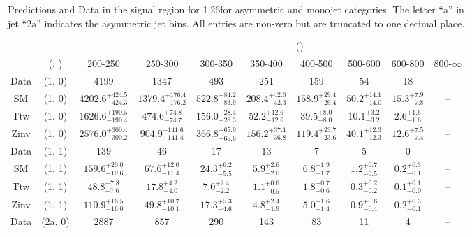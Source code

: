 \begin{table}[h!]
\tiny
\centering
\caption{Predictions and Data in the signal region for 1.26\ifb for asymmetric and monojet categories. The letter ``a'' in jet \eg ``2a''  indicates the asymmetric jet bins. All entries are non-zero but are truncated to one decimal place.\label{tab:predall_comb_sig_asym}}
\begin{tabular}
{cccccccccc}
	\hline\hline
&	&	& \multicolumn{8}{c}{\scalht (\gev)}\\ 
	&	 (\njet, \nb) & 200-250 & 250-300 & 300-350 & 350-400 & 400-500 & 500-600 & 600-800 & 800-$\infty$ \\ [0.8ex] 
\hline
	Data & (1. 0) & 4199 & 1347 & 493 & 251 & 159 & 54 & 18 & -- \\[0.5ex] 
	SM & (1. 0) & $4202.6^{+ 424.5 }_{- 424.3 }$ & $1379.4^{+ 176.4 }_{- 176.2 }$ & $522.8^{+ 84.2 }_{- 83.9 }$ & $208.4^{+ 42.6 }_{- 42.3 }$ & $158.9^{+ 29.4 }_{- 29.4 }$ & $50.2^{+ 14.1 }_{- 14.0 }$ & $15.3^{+ 7.9 }_{- 7.8 }$ & -- \\[0.5ex] 
	Ttw & (1. 0) & $1626.6^{+ 190.5 }_{- 190.4 }$ & $474.6^{+ 74.8 }_{- 74.7 }$ & $156.0^{+ 28.4 }_{- 28.3 }$ & $52.2^{+ 12.6 }_{- 12.6 }$ & $39.5^{+ 8.0 }_{- 8.0 }$ & $10.1^{+ 3.2 }_{- 3.2 }$ & $2.6^{+ 1.6 }_{- 1.6 }$ & -- \\[0.5ex] 
	Zinv & (1. 0) & $2576.0^{+ 300.4 }_{- 300.2 }$ & $904.9^{+ 141.6 }_{- 141.4 }$ & $366.8^{+ 65.9 }_{- 65.6 }$ & $156.2^{+ 37.1 }_{- 36.8 }$ & $119.4^{+ 23.7 }_{- 23.6 }$ & $40.1^{+ 12.3 }_{- 12.3 }$ & $12.6^{+ 7.5 }_{- 7.4 }$ & -- \\[0.5ex] 
	Data & (1. 1) & 139 & 46 & 17 & 13 & 7 & 5 & 0 & -- \\[0.5ex] 
	SM & (1. 1) & $159.6^{+ 20.0 }_{- 19.6 }$ & $67.6^{+ 12.0 }_{- 11.4 }$ & $24.3^{+ 6.2 }_{- 5.5 }$ & $5.9^{+ 2.6 }_{- 2.0 }$ & $6.8^{+ 1.9 }_{- 1.7 }$ & $1.2^{+ 0.7 }_{- 0.5 }$ & $0.2^{+ 0.3 }_{- 0.1 }$ & -- \\[0.5ex] 
	Ttw & (1. 1) & $48.8^{+ 7.8 }_{- 7.6 }$ & $17.8^{+ 4.2 }_{- 4.0 }$ & $7.0^{+ 2.4 }_{- 2.2 }$ & $1.1^{+ 0.6 }_{- 0.5 }$ & $1.8^{+ 0.7 }_{- 0.6 }$ & $0.3^{+ 0.2 }_{- 0.2 }$ & $0.1^{+ 0.1 }_{- 0.0 }$ & -- \\[0.5ex] 
	Zinv & (1. 1) & $110.9^{+ 16.5 }_{- 16.0 }$ & $49.8^{+ 10.7 }_{- 10.1 }$ & $17.3^{+ 5.3 }_{- 4.6 }$ & $4.8^{+ 2.4 }_{- 1.9 }$ & $5.0^{+ 1.6 }_{- 1.4 }$ & $0.9^{+ 0.6 }_{- 0.4 }$ & $0.2^{+ 0.3 }_{- 0.1 }$ & -- \\[0.5ex] 
	Data & (2a. 0) & 2887 & 857 & 290 & 143 & 83 & 11 & 4 & -- \\[0.5ex] 

\end{tabular}
\end{table}
